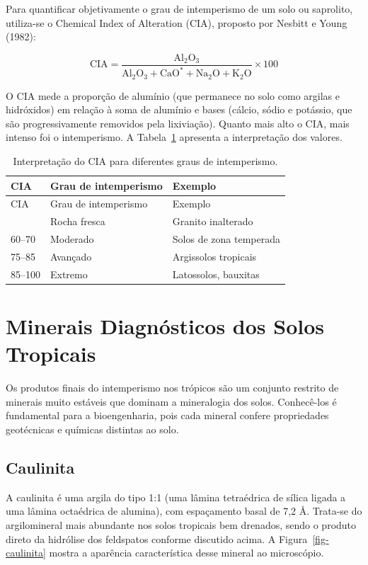 \documentclass[
  portuguese,
  11pt,
  a4paper,
  open=any]{scrbook}
\begin{document}
Para quantificar objetivamente o grau de intemperismo de um solo ou
saprolito, utiliza-se o Chemical Index of Alteration (CIA), proposto por
Nesbitt e Young (1982):

\[
\text{CIA} = \frac{\text{Al}_2\text{O}_3}{\text{Al}_2\text{O}_3 + \text{CaO}^* + \text{Na}_2\text{O} + \text{K}_2\text{O}} \times 100
\]

O CIA mede a proporção de alumínio (que permanece no solo como argilas e
hidróxidos) em relação à soma de alumínio e bases (cálcio, sódio e
potássio, que são progressivamente removidos pela lixiviação). Quanto
mais alto o CIA, mais intenso foi o intemperismo. A Tabela~\ref{tbl-cia}
apresenta a interpretação dos valores.

\begin{longtable}[]{@{}lll@{}}
\caption{Interpretação do CIA para diferentes graus de
intemperismo.}\label{tbl-cia}\tabularnewline
\toprule\noalign{}
CIA & Grau de intemperismo & Exemplo \\
\midrule\noalign{}
\endfirsthead
\toprule\noalign{}
CIA & Grau de intemperismo & Exemplo \\
\midrule\noalign{}
\endhead
\bottomrule\noalign{}
\endlastfoot
50 & Rocha fresca & Granito inalterado \\
60--70 & Moderado & Solos de zona temperada \\
75--85 & Avançado & Argissolos tropicais \\
85--100 & Extremo & Latossolos, bauxitas \\
\end{longtable}

\section{Minerais Diagnósticos dos Solos
Tropicais}\label{minerais-diagnuxf3sticos-dos-solos-tropicais}

Os produtos finais do intemperismo nos trópicos são um conjunto restrito
de minerais muito estáveis que dominam a mineralogia dos solos.
Conhecê-los é fundamental para a bioengenharia, pois cada mineral
confere propriedades geotécnicas e químicas distintas ao solo.

\subsection{Caulinita}\label{caulinita}

A caulinita é uma argila do tipo 1:1 (uma lâmina tetraédrica de sílica
ligada a uma lâmina octaédrica de alumina), com espaçamento basal de 7,2
Å. Trata-se do argilomineral mais abundante nos solos tropicais bem
drenados, sendo o produto direto da hidrólise dos feldspatos conforme
discutido acima. A Figura~\ref{fig-caulinita} mostra a aparência
característica desse mineral ao microscópio.
\end{document}
